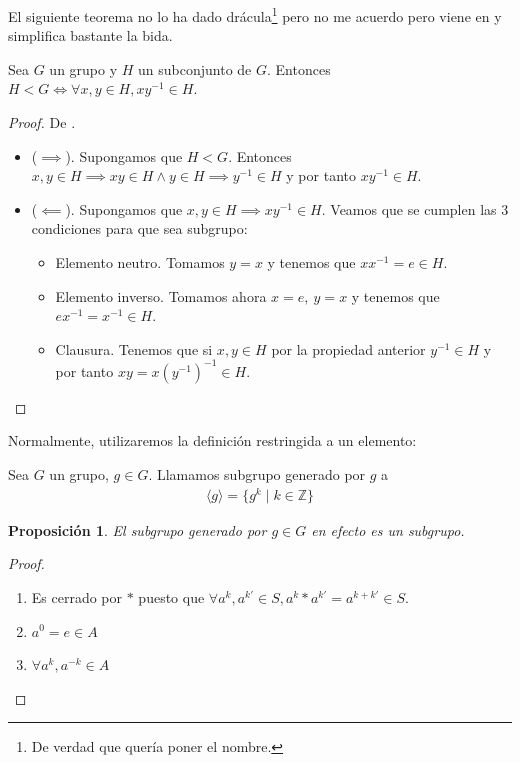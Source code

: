 \documentclass{book}
\newtheorem{pro}{Proposición}
\theoremstyle{definition}
\theoremstyle{remark}
\newcommand{\inv}[1]{#1^{-1}}
\begin{document}
El siguiente teorema no lo ha dado drácula\footnote{De verdad que quería poner el nombre.} pero no me acuerdo pero viene en \cite{dor96} y simplifica bastante la bida.

\begin{thm}
	\label{thm:subgrupoxinverso}
	Sea $G$ un grupo y $H$ un subconjunto de $G$. Entonces $H < G \iff \forall x,y \in H, x\inv{y} \in H$.
\end{thm}

\begin{proof}
	De \cite{dor96}.
	\begin{itemize}
		\item ($\implies$). Supongamos que $H < G$. Entonces $x,y \in H \implies xy \in H \land y \in H \implies \inv{y} \in H$ y por tanto $x\inv{y} \in H$.
		\item ($\impliedby$). Supongamos que $x,y \in H \implies x\inv{y} \in H$. Veamos que se cumplen las 3 condiciones para que sea subgrupo:
		\begin{itemize}
			\item Elemento neutro. Tomamos $y = x$ y tenemos que $x\inv{x} = e \in H$.
			\item Elemento inverso. Tomamos ahora $x = e,\ y = x$ y tenemos que $e\inv{x} = \inv{x} \in H$.
			\item Clausura. Tenemos que si $x,y \in H$ por la propiedad anterior $\inv{y} \in H$ y por tanto $xy = x\inv{(\inv{y})} \in H$.
		\end{itemize}
	\end{itemize}
\end{proof}


Normalmente, utilizaremos la definición restringida a un elemento:

\begin{dfn}
	\label{dfn:subgrupogenerado}
	Sea $G$ un grupo, $g \in G$. Llamamos subgrupo generado por $g$ a
	\begin{align}
		\langle g \rangle = \{g^k \mid k \in \mathbb{Z}\}
	\end{align}
\end{dfn}

\begin{pro}
	El subgrupo generado por $g \in G$ en efecto es un subgrupo.
\end{pro}

\begin{proof}$ $\newline
	\begin{enumerate}
		\item Es cerrado por $\ast$ puesto que $\forall a^k, a^{k'} \in S, a^k \ast a^{k'} = a^{k + k'} \in S$.
		\item $a^0 = e \in A$
		\item $\forall a^{k}, a^{-k} \in A$
	\end{enumerate}
\end{proof}
\end{document}

